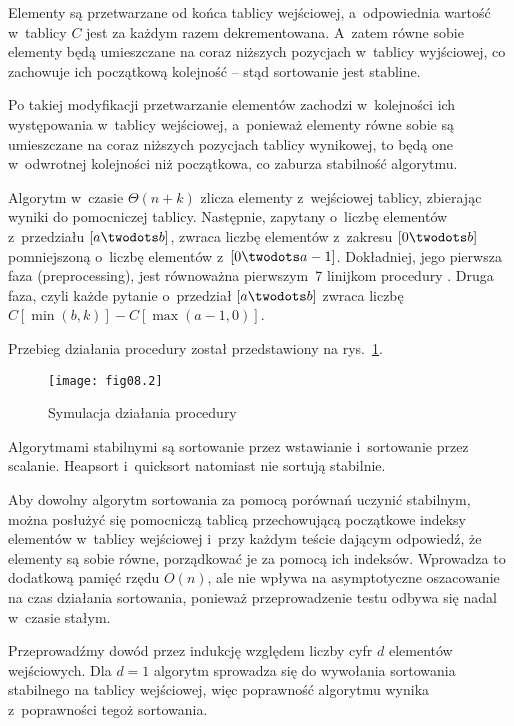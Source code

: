 \exercise %
Elementy są przetwarzane od końca tablicy wejściowej, a~odpowiednia wartość w~tablicy $C$ jest za każdym razem dekrementowana. A~zatem równe sobie elementy będą umieszczane na coraz niższych pozycjach w~tablicy wyjściowej, co zachowuje ich początkową kolejność -- stąd sortowanie jest stabline.

\exercise %
Po takiej modyfikacji przetwarzanie elementów zachodzi w~kolejności ich występowania w~tablicy wejściowej, a~ponieważ elementy równe sobie są  umieszczane na coraz niższych pozycjach tablicy wynikowej, to będą one w~odwrotnej kolejności niż początkowa, co zaburza stabilność algorytmu.

\exercise %
Algorytm w~czasie $\Theta(n+k)$ zlicza elementy z~wejściowej tablicy, zbierając wyniki do pomocniczej tablicy. Następnie, zapytany o~liczbę elementów z~przedziału $[a\twodots b]$, zwraca liczbę elementów z~zakresu $[0\twodots b]$ pomniejszoną o~liczbę elementów z~$[0\twodots a-1]$. Dokładniej, jego pierwsza faza (preprocessing), jest równoważna pierwszym~7 linijkom procedury . Druga faza, czyli każde pytanie o~przedział $[a\twodots b]$ zwraca liczbę $C[\min(b,k)]-C[\max(a-1,0)]$.


\exercise %
Przebieg działania procedury  został przedstawiony na rys.~\ref{fig:8.3-1}.
\begin{figure}[ht]
	\begin{center}
		\texttt{[image: fig08.2]}
	\end{center}
	\caption{Symulacja działania procedury } \label{fig:8.3-1}
\end{figure}

\exercise %
Algorytmami stabilnymi są sortowanie przez wstawianie i~sortowanie przez scalanie. Heapsort i~quicksort natomiast nie sortują stabilnie.

Aby dowolny algorytm sortowania za pomocą porównań uczynić stabilnym, można posłużyć się pomocniczą tablicą przechowującą początkowe indeksy elementów w~tablicy wejściowej i~przy każdym teście dającym odpowiedź, że elementy są sobie równe, porządkować je za pomocą ich indeksów. Wprowadza to dodatkową pamięć rzędu $O(n)$, ale nie wpływa na asymptotyczne oszacowanie na czas działania sortowania, ponieważ przeprowadzenie testu odbywa się nadal w~czasie stałym.

\exercise %
Przeprowadźmy dowód przez indukcję względem liczby cyfr $d$ elementów wejściowych. Dla $d=1$ algorytm sprowadza się do wywołania sortowania stabilnego na tablicy wejściowej, więc poprawność algorytmu wynika z~poprawności tegoż sortowania.

